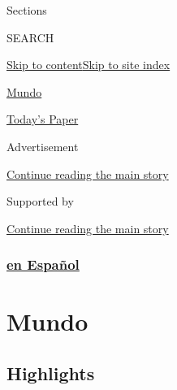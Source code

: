 Sections

SEARCH

\protect\hyperlink{site-content}{Skip to
content}\protect\hyperlink{site-index}{Skip to site index}

\href{https://www.nytimes.com/es/section/mundo}{Mundo}

\href{https://myaccount.nytimes.com/auth/login?response_type=cookie\&client_id=vi}{}

\href{https://www.nytimes.com/section/todayspaper}{Today's Paper}

Advertisement

\protect\hyperlink{after-top}{Continue reading the main story}

Supported by

\protect\hyperlink{after-sponsor}{Continue reading the main story}

\hypertarget{en-espauxf1ol}{%
\subsubsection{\texorpdfstring{\href{/es/}{en
Español}}{en Español}}\label{en-espauxf1ol}}

\hypertarget{mundo}{%
\section{Mundo}\label{mundo}}

\hypertarget{highlights}{%
\subsection{Highlights}\label{highlights}}

